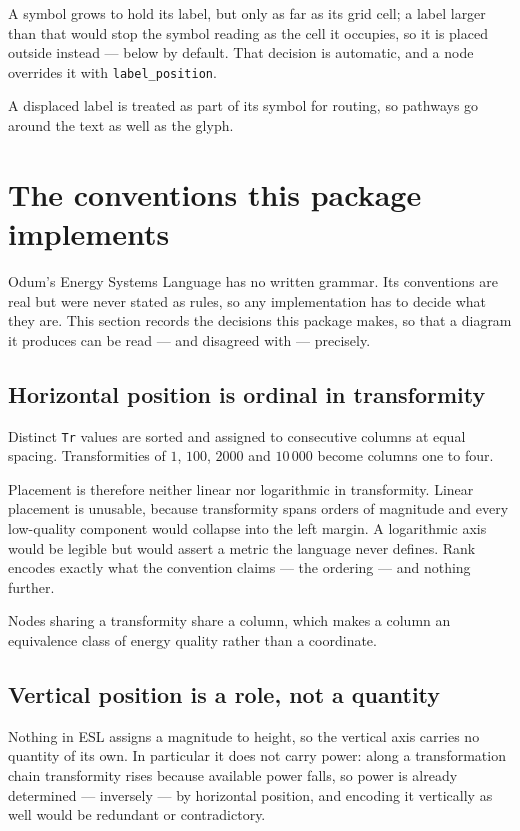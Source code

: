 \documentclass{article}
\begin{document}
A symbol grows to hold its label, but only as far as its grid cell; a label
larger than that would stop the symbol reading as the cell it occupies, so it is
placed outside instead --- below by default. That decision is automatic, and a
node overrides it with \texttt{label\_position}.

A displaced label is treated as part of its symbol for routing, so pathways go
around the text as well as the glyph.

\section{The conventions this package implements}
\label{sec:conventions}

Odum's Energy Systems Language has no written grammar. Its conventions are real
but were never stated as rules, so any implementation has to decide what they
are. This section records the decisions this package makes, so that a diagram it
produces can be read --- and disagreed with --- precisely.

\subsection{Horizontal position is ordinal in transformity}

Distinct \texttt{Tr} values are sorted and assigned to consecutive columns at
equal spacing. Transformities of $1$, $100$, $2000$ and $10\,000$ become columns
one to four.

Placement is therefore neither linear nor logarithmic in transformity. Linear
placement is unusable, because transformity spans orders of magnitude and every
low-quality component would collapse into the left margin. A logarithmic axis
would be legible but would assert a metric the language never defines. Rank
encodes exactly what the convention claims --- the ordering --- and nothing
further.

Nodes sharing a transformity share a column, which makes a column an equivalence
class of energy quality rather than a coordinate.

\subsection{Vertical position is a role, not a quantity}

Nothing in ESL assigns a magnitude to height, so the vertical axis carries no
quantity of its own. In particular it does not carry power: along a
transformation chain transformity rises because available power falls, so power
is already determined --- inversely --- by horizontal position, and encoding it
vertically as well would be redundant or contradictory.
\end{document}
